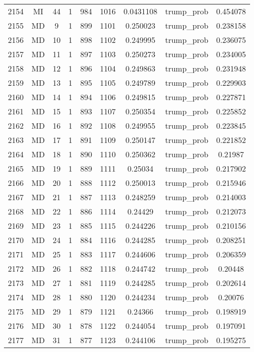 \documentclass[12pt,a4paper]{article}
\begin{document}
\begin{tabular}{r|cccccccc}
	2154 & MI & 44 & 1 & 984 & 1016 & 0.0431108 & trump\_prob & 0.454078 \\
	2155 & MD & 9 & 1 & 899 & 1101 & 0.250023 & trump\_prob & 0.238158 \\
	2156 & MD & 10 & 1 & 898 & 1102 & 0.249995 & trump\_prob & 0.236075 \\
	2157 & MD & 11 & 1 & 897 & 1103 & 0.250273 & trump\_prob & 0.234005 \\
	2158 & MD & 12 & 1 & 896 & 1104 & 0.249863 & trump\_prob & 0.231948 \\
	2159 & MD & 13 & 1 & 895 & 1105 & 0.249789 & trump\_prob & 0.229903 \\
	2160 & MD & 14 & 1 & 894 & 1106 & 0.249815 & trump\_prob & 0.227871 \\
	2161 & MD & 15 & 1 & 893 & 1107 & 0.250354 & trump\_prob & 0.225852 \\
	2162 & MD & 16 & 1 & 892 & 1108 & 0.249955 & trump\_prob & 0.223845 \\
	2163 & MD & 17 & 1 & 891 & 1109 & 0.250147 & trump\_prob & 0.221852 \\
	2164 & MD & 18 & 1 & 890 & 1110 & 0.250362 & trump\_prob & 0.21987 \\
	2165 & MD & 19 & 1 & 889 & 1111 & 0.25034 & trump\_prob & 0.217902 \\
	2166 & MD & 20 & 1 & 888 & 1112 & 0.250013 & trump\_prob & 0.215946 \\
	2167 & MD & 21 & 1 & 887 & 1113 & 0.248259 & trump\_prob & 0.214003 \\
	2168 & MD & 22 & 1 & 886 & 1114 & 0.24429 & trump\_prob & 0.212073 \\
	2169 & MD & 23 & 1 & 885 & 1115 & 0.244226 & trump\_prob & 0.210156 \\
	2170 & MD & 24 & 1 & 884 & 1116 & 0.244285 & trump\_prob & 0.208251 \\
	2171 & MD & 25 & 1 & 883 & 1117 & 0.244606 & trump\_prob & 0.206359 \\
	2172 & MD & 26 & 1 & 882 & 1118 & 0.244742 & trump\_prob & 0.20448 \\
	2173 & MD & 27 & 1 & 881 & 1119 & 0.244285 & trump\_prob & 0.202614 \\
	2174 & MD & 28 & 1 & 880 & 1120 & 0.244234 & trump\_prob & 0.20076 \\
	2175 & MD & 29 & 1 & 879 & 1121 & 0.24366 & trump\_prob & 0.198919 \\
	2176 & MD & 30 & 1 & 878 & 1122 & 0.244054 & trump\_prob & 0.197091 \\
	2177 & MD & 31 & 1 & 877 & 1123 & 0.244106 & trump\_prob & 0.195275 \\

\end{tabular}
\end{document}
